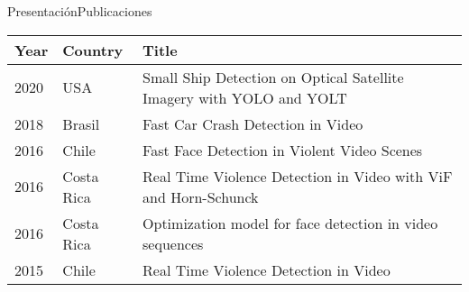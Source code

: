 \documentclass[10pt]{beamer}
\newcommand{\1}{
        	\setbeamertemplate{background}{
        		\texttt{[image: img/1]}
        		\tikz[overlay] \fill[fill opacity=0.75,fill=white] (0,0) rectangle (-\paperwidth,\paperheight);
        	}
}
\begin{document}
\begin{frame}{Presentación}{Publicaciones}
	\begin{table}[]
		\setlength{\tabcolsep}{0.5em} %
		{\renewcommand{\arraystretch}{1.4}%
			\begin{tabular}{llp{7cm}}
				\textbf{Year} & \textbf{Country} & \textbf{Title}                                                                                                              \\
				\hline
				2020          & USA              & Small Ship Detection on Optical Satellite Imagery with YOLO and YOLT                                                        \\
				2018          & Brasil           & Fast Car Crash Detection in Video                                                                                           \\
				2016          & Chile            & Fast Face Detection in Violent Video Scenes                                                                                 \\
				2016          & Costa Rica       & Real Time Violence Detection in Video with ViF and Horn-Schunck                                                             \\
				2016          & Costa Rica       & Optimization model for face detection in video sequences                                                                    \\
				2015          & Chile            & Real Time Violence Detection in Video                                                                                      
			\end{tabular}
		}
	\end{table}
\end{frame}
\end{document}

